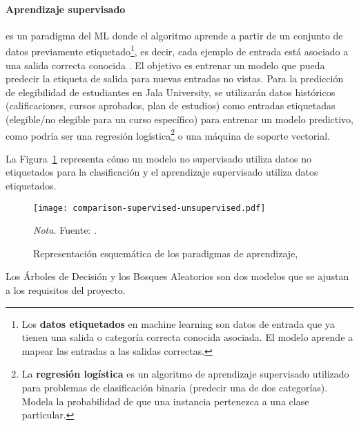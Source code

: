 \paragraph{Aprendizaje supervisado}
es un paradigma del ML donde el algoritmo aprende a partir de un conjunto de datos previamente etiquetado\footnote{Los \textbf{datos etiquetados} en machine learning son datos de entrada que ya tienen una salida o categoría correcta conocida asociada.
El modelo aprende a mapear las entradas a las salidas correctas.}, es decir, cada ejemplo de entrada está asociado a una salida correcta conocida \parencite{Bishop2006}.
El objetivo es entrenar un modelo que pueda predecir la etiqueta de salida para nuevas entradas no vistas.
Para la predicción de elegibilidad de estudiantes en Jala University, se utilizarán datos históricos (calificaciones, cursos aprobados, plan de estudios) como entradas etiquetadas (elegible/no elegible para un curso específico) para entrenar un modelo predictivo, como podría ser una regresión logística\footnote{La \textbf{regresión logística} es un algoritmo de aprendizaje supervisado utilizado para problemas de clasificación binaria (predecir una de dos categorías).
Modela la probabilidad de que una instancia pertenezca a una clase particular.} o una máquina de soporte vectorial.

La Figura~\ref{fig:mlComparison} representa cómo un modelo no supervisado utiliza datos no etiquetados para la clasificación y el aprendizaje supervisado utiliza datos etiquetados.

\begin{figure}
    \centering
    \caption{Representación esquemática de los paradigmas de aprendizaje, } \label{fig:mlComparison}
    \texttt{[image: comparison-supervised-unsupervised.pdf]}

    \vspace{0.5em}
    \begin{minipage}{\textwidth}
        \small\textit{Nota.} Fuente: \textcite{morimoto2021}.
    \end{minipage}
\end{figure}

Los Árboles de Decisión y los Bosques Aleatorios son dos modelos que se ajustan a los requisitos del proyecto.

